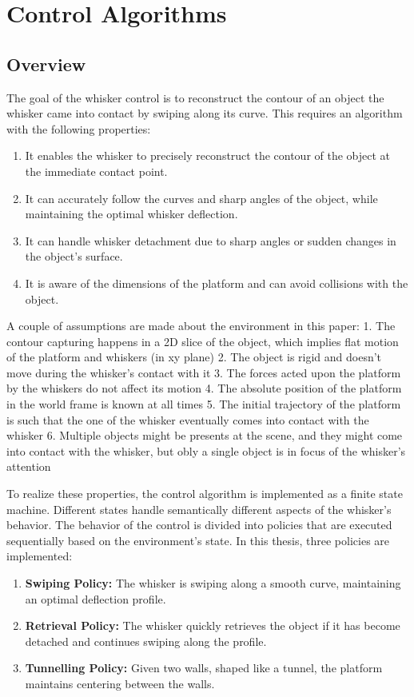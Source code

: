 

\chapter{Control Algorithms}


\section{Overview}

The goal of the whisker control is to reconstruct the contour of an object the whisker came into contact by swiping along its curve.
This requires an algorithm with the following properties:
\begin{enumerate}
    \item It enables the whisker to precisely reconstruct the contour of the object at the immediate contact point.
    \item It can accurately follow the curves and sharp angles of the object, while maintaining the optimal whisker deflection.
    \item It can handle whisker detachment due to sharp angles or sudden changes in the object's surface.
    \item It is aware of the dimensions of the platform and can avoid collisions with the object.
\end{enumerate}

A couple of assumptions are made about the environment in this paper:
1. The contour capturing happens in a 2D slice of the object, which implies flat motion of the platform and whiskers (in xy plane)
2. The object is rigid and doesn't move during the whisker's contact with it
3. The forces acted upon the platform by the whiskers do not affect its motion
4. The absolute position of the platform in the world frame is known at all times
5. The initial trajectory of the platform is such that the one of the whisker eventually comes into contact with the whisker
6. Multiple objects might be presents at the scene, and they might come into contact with the whisker, but obly a single object is in focus of the whisker's attention

To realize these properties, the control algorithm is implemented as a finite state machine.
Different states handle semantically different aspects of the whisker's behavior.
The behavior of the control is divided into policies that are executed sequentially based on the environment's state.
In this thesis, three policies are implemented:
\begin{enumerate}
    \item \textbf{Swiping Policy:} The whisker is swiping along a smooth curve, maintaining an optimal deflection profile.
    \item \textbf{Retrieval Policy:} The whisker quickly retrieves the object if it has become detached and continues swiping along the profile.
    \item \textbf{Tunnelling Policy:} Given two walls, shaped like a tunnel, the platform maintains centering between the walls.
\end{enumerate}



